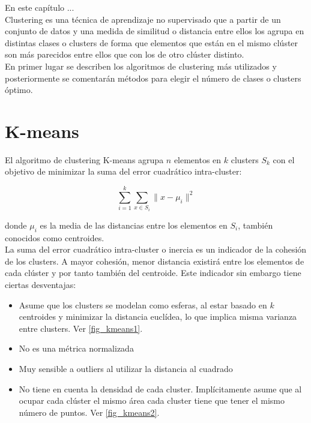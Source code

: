 En este capítulo ... \\

Clustering es una técnica de aprendizaje no supervisado que a partir de un conjunto de datos y una medida de similitud o distancia entre ellos los agrupa en distintas clases o clusters de forma que elementos que están en el mismo clúster son más parecidos entre ellos que con los de otro clúster distinto. \\

En primer lugar se describen los algoritmos de clustering más utilizados y posteriormente se comentarán métodos para elegir el número de clases o clusters óptimo. \\

\section{K-means}
El algoritmo de clustering K-means agrupa $n$ elementos en $k$ clusters $S_k$ con el objetivo de minimizar la suma del error cuadrático intra-cluster:

\begin{equation}
\sum_{i=1}^{k}\sum_{x\in S_i}\lVert x-\mu_{i}\rVert ^2 \nonumber
\end{equation}

donde $\mu_i$ es la media de las distancias entre los elementos en $S_i$, también conocidos como centroides. \\

La suma del error cuadrático intra-cluster o inercia es un indicador de la cohesión de los clusters. A mayor cohesión, menor distancia existirá entre los elementos de cada clúster y por tanto también del centroide. Este indicador sin embargo tiene ciertas desventajas:
\begin{itemize}
\item Asume que los clusters se modelan como esferas, al estar basado en $k$ centroides y minimizar la distancia euclídea, lo que implica misma varianza entre clusters. Ver \ref{fig_kmeans1}.
\item No es una métrica normalizada
\item Muy sensible a outliers al utilizar la distancia al cuadrado
\item No tiene en cuenta la densidad de cada cluster. Implícitamente asume que al ocupar cada clúster el mismo área cada cluster tiene que tener el mismo número de puntos. Ver \ref{fig_kmeans2}.
\end{itemize}

